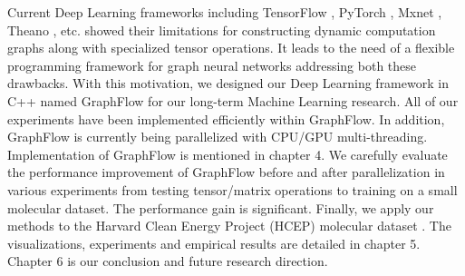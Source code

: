 \documentclass[a4paper]{article}
\begin{document}
Current Deep Learning frameworks including TensorFlow \cite{Google-Research}, PyTorch \cite{PyTorch}, Mxnet \cite{Mxnet}, Theano \cite{Theano}, etc. showed their limitations for constructing dynamic computation graphs along with specialized tensor operations. It leads to the need of a flexible programming framework for graph neural networks addressing both these drawbacks. With this motivation, we designed our Deep Learning framework in C++ named GraphFlow for our long-term Machine Learning research. All of our experiments have been implemented efficiently within GraphFlow. In addition, GraphFlow is currently being parallelized with CPU/GPU multi-threading. Implementation of GraphFlow is mentioned in chapter 4. We carefully evaluate the performance improvement of GraphFlow before and after parallelization in various experiments from testing tensor/matrix operations to training on a small molecular dataset. The performance gain is significant. Finally, we apply our methods to the Harvard Clean Energy Project (HCEP) molecular dataset \cite{Johannes}. The visualizations, experiments and empirical results are detailed in chapter 5. Chapter 6 is our conclusion and future research direction.
\end{document}
